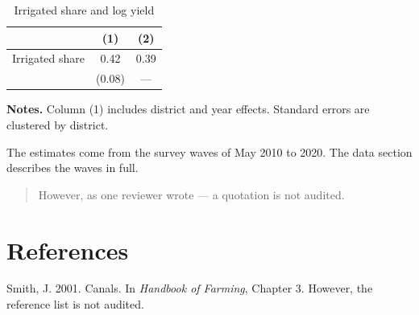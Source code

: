 \documentclass[12pt]{article}
\begin{document}
\begin{table}[htbp]
\centering
\caption{Irrigated share and log yield}
\label{tab:main}
\begin{tabular}{lcc}
\toprule
 & (1) & (2) \\
\midrule
Irrigated share & 0.42 & 0.39 \\
 & (0.08) & --- \\
\bottomrule
\end{tabular}

\smallskip
{\footnotesize \textbf{Notes.} Column (1) includes district and year effects. Standard errors
are clustered by district.}
\end{table}

The estimates come from the survey waves of May 2010 to 2020. The data section describes the
waves in full.

\begin{quote}
However, as one reviewer wrote --- a quotation is not audited.
\end{quote}

\section*{References}
\bibentry Smith, J. 2001. Canals. In \textit{Handbook of Farming}, Chapter 3. However, the
reference list is not audited.
\end{document}
